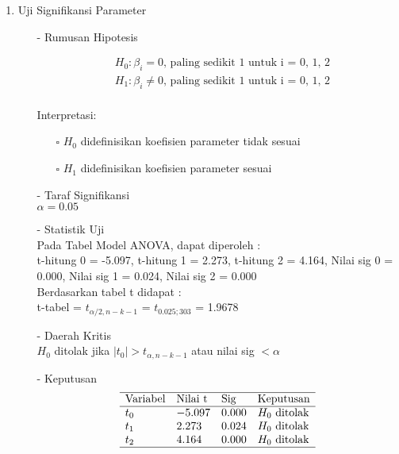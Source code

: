 \begin{enumerate}
\item Uji Signifikansi Parameter \\
\begin{test}{
    \begin{enumerate}
    \item[-] Rumusan Hipotesis \\
    \begin{fleqn}[\parindent]
        \begin{equation*}
        \begin{split}
        &H_0 : \beta_i = 0 \text{, paling sedikit 1 untuk i = 0, 1, 2} \\ 
        &H_1 : \beta_i \neq 0 \text{, paling sedikit 1 untuk i = 0, 1, 2}\\
        \end{split}
        \end{equation*}
    \end{fleqn}
    Interpretasi:
    \begin{enumerate}
    \item[$\square$] $H_0$ didefinisikan koefisien parameter tidak sesuai
    \item[$\square$] $H_1$ didefinisikan koefisien parameter sesuai
    \end{enumerate}

    \item[-] Taraf Signifikansi \\
    $\alpha = 0.05$

    \item[-] Statistik Uji \\
    Pada Tabel Model ANOVA, dapat diperoleh : \\
    t-hitung 0 = -5.097, t-hitung 1 = 2.273, t-hitung 2 = 4.164, Nilai sig 0 = 0.000, Nilai sig 1 = 0.024, Nilai sig 2 = 0.000 \\
    Berdasarkan tabel t didapat : \\
    t-tabel = $t_{\alpha/2, n-k-1}$ = $t_{0.025; 303}$ = 1.9678

    \item[-] Daerah Kritis \\
    $H_0$ ditolak jika $|t_0| > t_{\alpha, n-k-1}$ atau nilai sig $< \alpha$

    \item[-] Keputusan \\
    $$\begin{array}{lllll}
        \hline 
        \text{Variabel} & \text{Nilai t} & \text{Sig} & \text{Keputusan}  \\
        \hline 
        t_0 & -5.097 & 0.000 & H_0 \text{ ditolak} \\
        t_1 & 2.273 & 0.024 & H_0 \text{ ditolak} \\
        t_2 & 4.164 & 0.000 & H_0 \text{ ditolak} \\
        \hline
    \end{array}$$


\end{enumerate}}
\end{test}
\end{enumerate}
